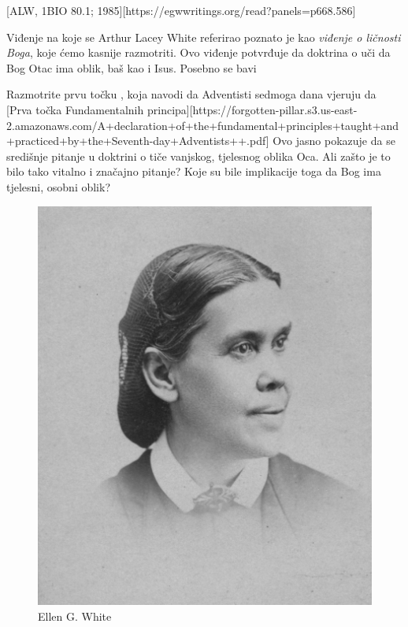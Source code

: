 [ALW, 1BIO 80.1; 1985][https://egwwritings.org/read?panels=p668.586]

Viđenje na koje se Arthur Lacey White referirao poznato je kao \textit{viđenje o ličnosti Boga}, koje ćemo kasnije razmotriti. Ovo viđenje potvrđuje da doktrina o  uči da Bog Otac ima oblik, baš kao i Isus. Posebno se bavi 

Razmotrite prvu točku , koja navodi da Adventisti sedmoga dana vjeruju da [Prva točka Fundamentalnih principa][https://forgotten-pillar.s3.us-east-2.amazonaws.com/A+declaration+of+the+fundamental+principles+taught+and+practiced+by+the+Seventh-day+Adventists++.pdf] Ovo jasno pokazuje da se središnje pitanje u doktrini o  tiče vanjskog, tjelesnog oblika Oca. Ali zašto je to bilo tako vitalno i značajno pitanje? Koje su bile implikacije toga da Bog ima tjelesni, osobni oblik?

\begin{figure}[t]
    \centering
    \includegraphics[width=0.65\linewidth]{images/ellen-white.jpg}
    \caption*{Ellen G. White}
    \label{fig:ellen-g-white}
\end{figure}


